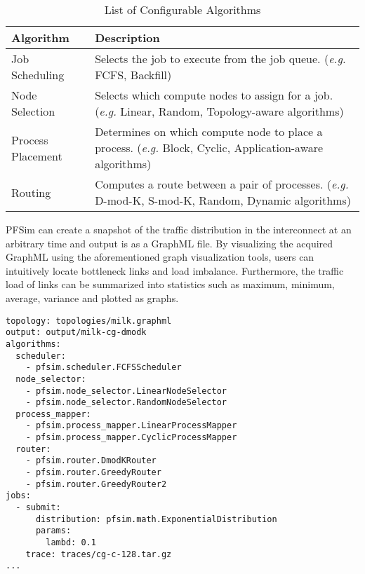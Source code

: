 \begin{table}
    \centering
    \normalsize
    \caption{List of Configurable Algorithms}%
    \label{tbl:simulator-algorithm}
    \begin{tabularx}{\linewidth}{lX}
        \toprule
        Algorithm         & Description                                                 \\
        \midrule
        Job Scheduling    & Selects the job to execute from the job queue.
                            (\emph{e.g.} FCFS, Backfill)                                \\
        Node Selection    & Selects which compute nodes to assign for a job.
                            (\emph{e.g.} Linear, Random, Topology-aware algorithms)     \\
        Process Placement & Determines on which compute node to place a process.
                            (\emph{e.g.} Block, Cyclic, Application-aware algorithms)   \\
        Routing           & Computes a route between a pair of processes.
                            (\emph{e.g.} D-mod-K, S-mod-K, Random, Dynamic algorithms)  \\
        \bottomrule
    \end{tabularx}
\end{table}

PFSim can create a snapshot of the traffic distribution in the
interconnect at an arbitrary time and output is as a GraphML file. By
visualizing the acquired GraphML using the aforementioned graph
visualization tools, users can intuitively locate bottleneck links and
load imbalance. Furthermore, the traffic load of links can be summarized
into statistics such as maximum, minimum, average, variance and plotted
as graphs.

\begin{lstlisting}[caption={Example of a Simulation Scenario}, label={lst:simulation-scenario}, linewidth={\columnwidth}, float={htbp}]
topology: topologies/milk.graphml
output: output/milk-cg-dmodk
algorithms:
  scheduler:
    - pfsim.scheduler.FCFSScheduler
  node_selector:
    - pfsim.node_selector.LinearNodeSelector
    - pfsim.node_selector.RandomNodeSelector
  process_mapper:
    - pfsim.process_mapper.LinearProcessMapper
    - pfsim.process_mapper.CyclicProcessMapper
  router:
    - pfsim.router.DmodKRouter
    - pfsim.router.GreedyRouter
    - pfsim.router.GreedyRouter2
jobs:
  - submit:
      distribution: pfsim.math.ExponentialDistribution
      params:
        lambd: 0.1
    trace: traces/cg-c-128.tar.gz
...
\end{lstlisting}

